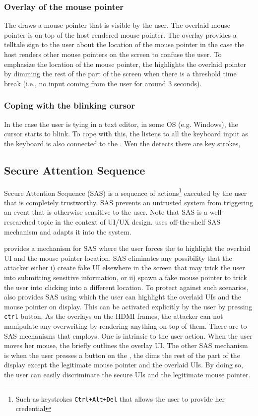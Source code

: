 \subsubsection{Overlay of the mouse pointer} The \device draws a mouse pointer that is visible by the user. The overlaid mouse pointer is on top of the host rendered mouse pointer. The overlay provides a telltale sign to the user about the location of the mouse pointer in the case the host renders other mouse pointers on the screen to confuse the user. To emphasize the location of the mouse pointer, the \device highlights the overlaid pointer by dimming the rest of the part of the screen when there is a threshold time break (i.e., no input coming from the user for around 3 seconds).


\subsubsection{Coping with the blinking cursor} In the case the user is tying in a text editor, in some OS (e.g. Windows), the cursor starts to blink. To cope with this, the \device listens to all the keyboard input as the keyboard is also connected to the \device. Wen the \device detects there are key strokes,






\subsection{Secure Attention Sequence}
\label{sec:systemDesign:SAS}

Secure Attention Sequence (SAS) is a sequence of actions\footnote{Such as keystrokes \texttt{Ctrl+Alt+Del} that allows the user to provide her credential} executed by the user that is completely trustworthy. SAS prevents an untrusted system from triggering an event that is otherwise sensitive to the user. Note that SAS is a well-researched topic in the context of UI/UX design. \name uses off-the-shelf SAS mechanism and adapts it into the system. 

\name provides a mechanism for SAS where the user forces the \device to highlight the overlaid UI and the mouse pointer location. SAS eliminates any possibility that the attacker either i) create fake UI elsewhere in the screen that may trick the user into submitting sensitive information, or ii) spawn a fake mouse pointer to trick the user into clicking into a different location. To protect against such scenarios, \device also provides SAS using which the user can highlight the overlaid UIs and the mouse pointer on display. 
This can be activated explicitly by the user by pressing \texttt{ctrl} button.
As the \device overlays on the HDMI frames, the attacker can not manipulate any overwriting by rendering anything on top of them. 
There are to SAS mechanisms that \name employs. One is intrinsic to the user action. When the user moves her mouse, the \device briefly outlines the overlay UI. The other SAS mechanism is when the user presses a button on the \device, the \device dims the rest of the part of the display except the legitimate mouse pointer and the overlaid UIs. By doing so, the user can easily discriminate the secure UIs and the legitimate mouse pointer.

